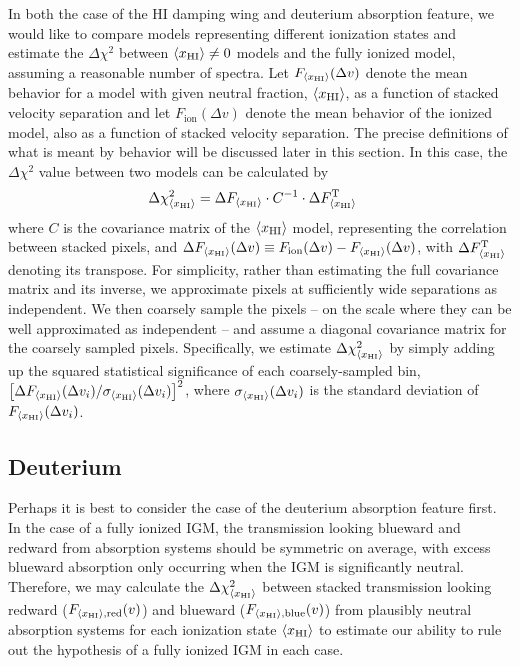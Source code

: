 In both the case of the HI damping wing and deuterium absorption feature, we would like to compare models representing different ionization states and estimate the $\Delta \chi^2$ between $\langle x_{\text{HI}}\rangle \neq 0$ models and the fully ionized model, assuming a reasonable number of spectra. Let $F_{\langle x_{\text{HI}}\rangle}(\Delta v)$ denote the mean behavior for a model with given neutral fraction, $\langle x_{\text{HI}}\rangle$, as a function of stacked velocity separation and let $F_{\text{ion}}(\Delta v)$ denote the mean behavior of the ionized model, also as a function of stacked velocity separation. The precise definitions of what is meant by behavior will be discussed later in this section. In this case, the $\Delta \chi^2$ value between two models can be calculated by
\begin{align}
\Delta \chi^2_{\langle x_{\text{HI}}\rangle} &= \Delta F_{\langle x_{\text{HI}}\rangle} \cdot C^{-1} \cdot \Delta F_{\langle x_{\text{HI}}\rangle}^{\text{T}} \label{eq:ChiSquare}
\end{align}
where $C$ is the covariance matrix of the $\langle x_{\text{HI}}\rangle$ model, representing the correlation between stacked pixels, and $\Delta F_{\langle x_{\text{HI}}\rangle}(\Delta v) \equiv F_{\text{ion}}(\Delta v) - F_{\langle x_{\text{HI}}\rangle}(\Delta v)$, with $\Delta F_{\langle x_{\text{HI}}\rangle}^{\text{T}}$ denoting its transpose. For simplicity, rather than estimating the full covariance matrix and its inverse, we approximate pixels at sufficiently wide separations as independent. We
then coarsely sample the pixels -- on the scale where they can be well approximated as independent -- and assume a diagonal covariance matrix for the coarsely sampled pixels. Specifically,
we estimate  $\Delta \chi^{2}_{\langle x_{\text{HI}}\rangle}$ by simply adding up the squared statistical significance of each coarsely-sampled bin, $\left[\Delta F_{\langle x_{\text{HI}}\rangle}(\Delta v_i)/\sigma_{\langle x_{\text{HI}}\rangle}(\Delta v_i)\right]^2$, where $\sigma_{\langle x_{\text{HI}}\rangle}(\Delta v_i)$ is the standard deviation of $F_{\langle x_{\text{HI}}\rangle}(\Delta v_i)$. 




\subsection{Deuterium} \label{sec:DForecast}

 Perhaps it is best to consider the case of the deuterium absorption feature first. In the case of a fully ionized IGM, the transmission looking blueward and redward from absorption systems should be symmetric on average, with excess blueward absorption only occurring when the IGM is significantly neutral. Therefore, we may calculate the $\Delta \chi_{\langle x_{\text{HI}}\rangle}^2$ between stacked transmission looking redward ($F_{\langle x_{\text{HI}}\rangle,\text{red}}(v)$) and blueward ($F_{\langle x_{\text{HI}}\rangle,\text{blue}}(v)$) from plausibly neutral absorption systems for each ionization state $\langle x_{\text{HI}}\rangle$ to estimate our ability to rule out the hypothesis of a fully ionized IGM in each case. 
 
